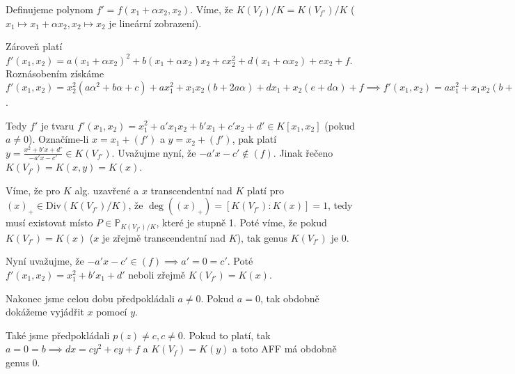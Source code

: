 \documentclass[12pt, a4paper]{article}
\begin{document}
Definujeme polynom $f' = f(x_1+\alpha x_2, x_2)$. Víme, že $K(V_f)/K = K(V_{f'})/K$ ($x_1 \mapsto x_1+\alpha x_2, x_2 \mapsto x_2$ je lineární zobrazení).

Zároveň platí $f'(x_1,x_2) = a(x_1+\alpha x_2)^2 + b(x_1+\alpha x_2)x_2 + cx_2^2 + d(x_1+\alpha x_2) + ex_2 + f$. Roznásobením získáme $f'(x_1,x_2) = x_2^2(a \alpha^2 + b \alpha + c) + ax_1^2 + x_1x_2(b+2a\alpha) + dx_1 + x_2(e+d\alpha)+f \implies f'(x_1,x_2) = ax_1^2 + x_1x_2(b+2a\alpha) + dx_1 + x_2(e+d\alpha)+f$. 

Tedy $f'$ je tvaru $f'(x_1,x_2) = x_1^2+a'x_1x_2+b'x_1+c'x_2+d' \in K[x_1,x_2]$ (pokud $a\neq0$). Označíme-li $x = x_1+(f')$ a $y = x_2 + (f')$, pak platí $y = \frac{x^2+b'x+d'}{-a'x-c'} \in K(V_{f'})$. Uvažujme nyní, že $-a'x-c' \notin (f)$. Jinak řečeno $K(V_{f'}) = K(x,y)=K(x)$.

Víme, že pro $K$ alg. uzavřené a $x$ transcendentní nad $K$ platí pro $(x)_+ \in \text{Div}(K(V_{f'})/K)$, že $\deg((x)_+) = [K(V_{f'}):K(x)] = 1$, tedy musí existovat místo $P \in \mathbb{P}_{K(V_{f'})/K}$, které je stupně 1.
Poté víme, že pokud $K(V_{f'}) = K(x)$ ($x$ je zřejmě transcendentní nad $K$), tak genus $K(V_{f'})$ je 0.

Nyní uvažujme, že $-a'x-c' \in (f) \implies a'=0=c'$. Poté $f'(x_1,x_2) = x_1^2+b'x_1+d'$ neboli zřejmě $K(V_{f'})=K(x)$.

Nakonec jsme celou dobu předpokládali $a \neq 0$. Pokud $a = 0$, tak obdobně dokážeme vyjádřit $x$ pomocí $y$. 

Také jsme předpokládali $p(z) \neq c, c \neq 0$. Pokud to platí, tak $a=0=b \implies dx = cy^2+ey+f$ a $K(V_f) = K(y)$ a toto AFF má obdobně genus 0.
\end{document}

